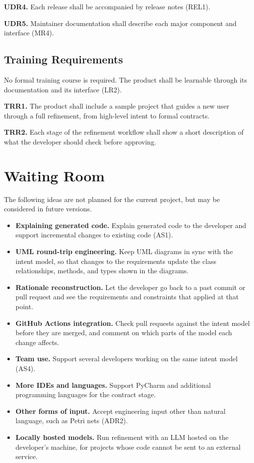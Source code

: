 \documentclass[12pt]{article}
\begin{document}
\medskip
\noindent\textbf{UDR4.} Each release shall be accompanied by release notes
(REL1).

\medskip
\noindent\textbf{UDR5.} Maintainer documentation shall describe each major
component and interface (MR4).

\subsection{Training Requirements}

No formal training course is required. The product shall be learnable through
its documentation and its interface (LR2).

\medskip
\noindent\textbf{TRR1.} The product shall include a sample project that guides
a new user through a full refinement, from high-level intent to formal
contracts.

\medskip
\noindent\textbf{TRR2.} Each stage of the refinement workflow shall show a short
description of what the developer should check before approving.

\section{Waiting Room}

The following ideas are not planned for the current project, but may be
considered in future versions.

\begin{itemize}
  \item \textbf{Explaining generated code.} Explain generated code to the
  developer and support incremental changes to existing code (AS1).
  \item \textbf{UML round-trip engineering.} Keep UML diagrams in sync with the
  intent model, so that changes to the requirements update the class
  relationships, methods, and types shown in the diagrams.
  \item \textbf{Rationale reconstruction.} Let the developer go back to a past
  commit or pull request and see the requirements and constraints that applied
  at that point.
  \item \textbf{GitHub Actions integration.} Check pull requests against the
  intent model before they are merged, and comment on which parts of the model
  each change affects.
  \item \textbf{Team use.} Support several developers working on the same intent
  model (AS4).
  \item \textbf{More IDEs and languages.} Support PyCharm and additional
  programming languages for the contract stage.
  \item \textbf{Other forms of input.} Accept engineering input other than
  natural language, such as Petri nets (ADR2).
  \item \textbf{Locally hosted models.} Run refinement with an LLM hosted on the
  developer's machine, for projects whose code cannot be sent to an external
  service.
\end{itemize}
\end{document}
